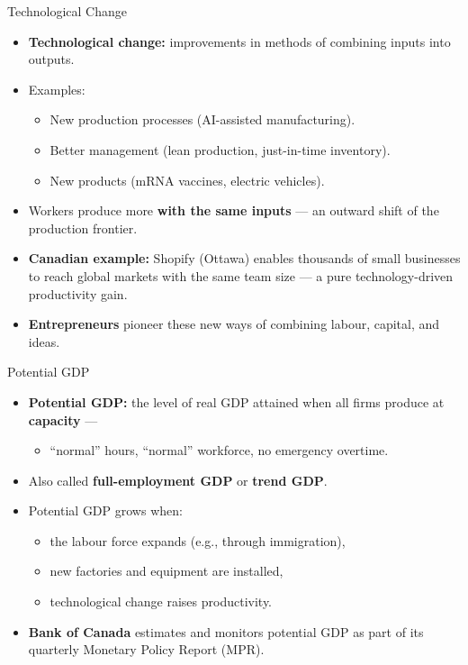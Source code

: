 \documentclass[aspectratio=169]{beamer}
\begin{document}
\begin{frame}{Technological Change}
\transfade
\begin{itemize}
  \item \textbf{Technological change:} improvements in methods of combining inputs into outputs.
  \item Examples:
  \begin{itemize}
    \item New production processes (AI-assisted manufacturing).
    \item Better management (lean production, just-in-time inventory).
    \item New products (mRNA vaccines, electric vehicles).
  \end{itemize}
  \item Workers produce more \textbf{with the same inputs} --- an outward shift of the production frontier.
  \item \textbf{Canadian example:} Shopify (Ottawa) enables thousands of small businesses to reach global markets with the same team size --- a pure technology-driven productivity gain.
  \item \textbf{Entrepreneurs} pioneer these new ways of combining labour, capital, and ideas.
\end{itemize}
\end{frame}


\begin{frame}{Potential GDP}
\transfade
\begin{itemize}
  \item \textbf{Potential GDP:} the level of real GDP attained when all firms produce at \textbf{capacity} ---
  \begin{itemize}
    \item ``normal'' hours, ``normal'' workforce, no emergency overtime.
  \end{itemize}
  \item Also called \textbf{full-employment GDP} or \textbf{trend GDP}.
  \item Potential GDP grows when:
  \begin{itemize}
    \item the labour force expands (e.g., through immigration),
    \item new factories and equipment are installed,
    \item technological change raises productivity.
  \end{itemize}
  \item \textbf{Bank of Canada} estimates and monitors potential GDP as part of its quarterly Monetary Policy Report (MPR).
\end{itemize}
\end{frame}
\end{document}
